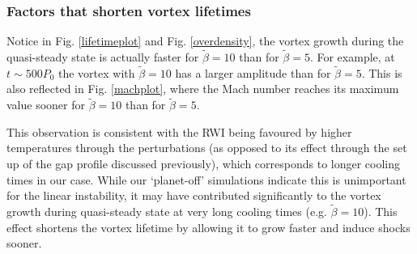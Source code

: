 \subsubsection{Factors that shorten vortex lifetimes} 
Notice in Fig. \ref{lifetimeplot} and Fig. \ref{overdensity}, the vortex 
growth during the quasi-steady state is actually faster for $\tilde{\beta}=10$
than for $\tilde{\beta}=5$. 
For example, at $t\sim 500P_0$ the vortex with    
$\tilde{\beta}=10$ has a larger 
amplitude than for $\tilde{\beta}=5$. This is also reflected in Fig. \ref{machplot}, where the
Mach number reaches its maximum value sooner for $\tilde{\beta}=10$
than for $\tilde{\beta}=5$.  

This observation is consistent with the RWI being favoured by 
higher temperatures \citep{li00,lin12c} through the perturbations 
(as opposed to its effect through the set up of the gap profile
discussed previously),
which corresponds to longer cooling times in our case. 
While our `planet-off' simulations indicate this is unimportant for
the linear instability, it may have contributed  
significantly to the vortex growth during quasi-steady state at very
long cooling times (e.g. $\tilde{\beta}=10$). This effect shortens the
vortex lifetime by allowing it to grow faster and induce shocks
sooner.  

%
